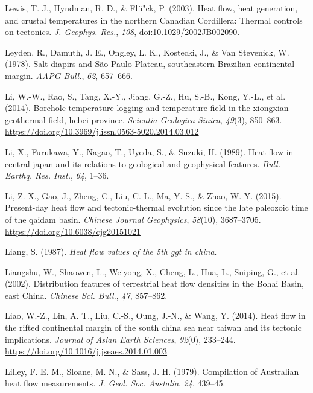 \begin{CSLReferences}{1}{1}
\leavevmode{}%
Lewis, T. J., Hyndman, R. D., \& Flü"ck, P. (2003). Heat flow, heat generation, and crustal temperatures in the northern {Canadian Cordillera}: Thermal controls on tectonics. \emph{J. Geophys. Res.}, \emph{108}, doi:10.1029/2002JB002090.

\leavevmode{}%
Leyden, R., Damuth, J. E., Ongley, L. K., Kostecki, J., \& Van Stevenick, W. (1978). Salt diapirs and {São Paulo Plateau}, southeastern {Brazilian} continental margin. \emph{AAPG Bull.}, \emph{62}, 657--666.

\leavevmode{}%
Li, W.-W., Rao, S., Tang, X.-Y., Jiang, G.-Z., Hu, S.-B., Kong, Y.-L., et al. (2014). Borehole temperature logging and temperature field in the xiongxian geothermal field, hebei province. \emph{Scientia Geologica Sinica}, \emph{49}(3), 850--863. \url{https://doi.org/10.3969/j.issn.0563-5020.2014.03.012}

\leavevmode{}%
Li, X., Furukawa, Y., Nagao, T., Uyeda, S., \& Suzuki, H. (1989). Heat flow in central japan and its relations to geological and geophysical features. \emph{Bull. Earthq. Res. Inst.}, \emph{64}, 1--36.

\leavevmode{}%
Li, Z.-X., Gao, J., Zheng, C., Liu, C.-L., Ma, Y.-S., \& Zhao, W.-Y. (2015). Present-day heat flow and tectonic-thermal evolution since the late paleozoic time of the qaidam basin. \emph{Chinese Journal Geophysics}, \emph{58}(10), 3687--3705. \url{https://doi.org/10.6038/cjg20151021}

\leavevmode{}%
Liang, S. (1987). \emph{Heat flow values of the 5th ggt in china}.

\leavevmode{}%
Liangshu, W., Shaowen, L., Weiyong, X., Cheng, L., Hua, L., Suiping, G., et al. (2002). Distribution features of terrestrial heat flow densities in the {Bohai Basin, east China}. \emph{Chinese Sci. Bull.}, \emph{47}, 857--862.

\leavevmode{}%
Liao, W.-Z., Lin, A. T., Liu, C.-S., Oung, J.-N., \& Wang, Y. (2014). Heat flow in the rifted continental margin of the south china sea near taiwan and its tectonic implications. \emph{Journal of Asian Earth Sciences}, \emph{92}(0), 233--244. \url{https://doi.org/10.1016/j.jseaes.2014.01.003}

\leavevmode{}%
Lilley, F. E. M., Sloane, M. N., \& Sass, J. H. (1979). Compilation of {Australian} heat flow measurements. \emph{J. Geol. Soc. Austalia}, \emph{24}, 439--45.


\end{CSLReferences}
